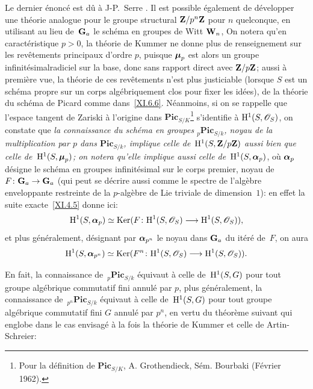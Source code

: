 \begin{remarques}
\label{XI.6.11}
Le dernier \'enonc\'e est d\^u \`a
J-P.\, Serre
\cite{XI.9}. Il est
possible \'egalement de d\'evelopper une th\'eorie analogue pour
le groupe structural $\mathbf{Z}/p^n\mathbf{Z}$ pour $n$ quelconque, en utilisant au
lieu de~$\mathbf{G}_a$ le sch\'ema en groupes de Witt $\mathbf{W}_n$, \cf \loccit On notera qu'en caract\'eristique $p>0$, la th\'eorie de
Kummer ne donne plus de renseignement sur les rev\^etements
principaux d'ordre $p$, puisque $\boldsymbol{\mu}_p$ est alors un groupe
\og infinit\'esimal\fg \ie radiciel sur la base, donc sans rapport
direct avec $\mathbf{Z}/p\mathbf{Z}$; aussi \`a premi\`ere vue, la th\'eorie
de ces rev\^etements n'est plus justiciable (lorsque $S$ est un
sch\'ema propre sur un corps alg\'ebriquement clos pour fixer les
id\'ees), de la th\'eorie du sch\'ema de Picard comme
dans~\ref{XI.6.6}. N\'eanmoins, si on se rappelle que l'espace
tangent de Zariski \`a l'origine dans
$\mathbf{Pic}_{S/K}$\footnote{Pour la d\'efinition de
$\mathbf{Pic}_{S/K}$, \cf A. Grothendieck, S\'em. Bourbaki 
(F\'evrier 1962).} s'identifie \`a $\H^1(S,\cal{O}_S)$, on
constate que \emph{la connaissance du schéma en groupes
${_p}\mathbf{Pic}_{S/k}$, noyau de la multiplication par $p$ dans
$\mathbf{Pic}_{S/k}$, implique celle de~$\mathrm{H}^1(S,\mathbf{Z}/p\mathbf{Z})$ aussi bien
que celle de~$\mathrm{H}^1(S,\boldsymbol{\mu}_p)$; on notera qu'elle implique aussi
celle de~$\mathrm{H}^1(S,\boldsymbol{\alpha}_p)$}, o\`u $\boldsymbol{\alpha}_p$
d\'esigne le sch\'ema en groupes infinit\'esimal sur le corps
premier, noyau de~$F\colon\GG_a\to\GG_a$ (qui peut se d\'ecrire
aussi comme le spectre de l'alg\`ebre enveloppante restreinte de la
$p$-alg\`ebre de Lie triviale de dimension~$1$): en effet la suite
exacte~\ref{XI.4.5} donne ici:
$$
\H^1(S,\bbalpha_p)\simeq\Ker
(F\colon\H^1(S,\cal{O}_S)\to\H^1(S,\cal{O}_S)),
$$
et plus g\'en\'eralement, d\'esignant par $\boldsymbol{\alpha}_{p^n}$
le noyau dans $\mathbf{G}_a$ du \nieme it\'er\'e de~$F$, on aura
$$
\H^1(S,\bbalpha_{p^n})\simeq\Ker(F^n\colon\H^1(S,\cal{O}_S)\to
\H^1(S,\cal{O}_S)).
$$

En fait, la connaissance de~${_p}\mathbf{Pic}_{S/k}$ \'equivaut \`a
celle de~$\mathrm{H}^1(S,G)$ pour tout groupe alg\'ebrique
commutatif fini annul\'e par $p$, plus g\'en\'eralement, la
connaissance de~${_{p^n}}\mathbf{Pic}_{S/k}$ \'equivaut \`a celle
de~$\mathrm{H}^1(S,G)$ pour tout groupe alg\'ebrique commutatif fini $G$
annul\'e par $p^n$, en vertu du th\'eor\`eme suivant qui englobe
dans le cas envisag\'e \`a la fois la th\'eorie de Kummer et
celle de Artin-Schreier:


\end{remarques}
